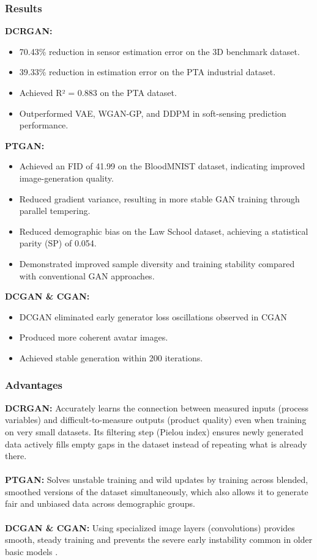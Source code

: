 \documentclass[12pt,a4paper]{article}
\begin{document}
\subsubsection{Results}
\textbf{DCRGAN:}
\begin{itemize}
    \item 70.43\% reduction in sensor estimation error on the 3D benchmark dataset.
    \item 39.33\% reduction in estimation error on the PTA industrial dataset.
    \item Achieved R² = 0.883 on the PTA dataset.
    \item Outperformed VAE, WGAN-GP, and DDPM in soft-sensing prediction performance.
\end{itemize}
\textbf{PTGAN:}
\begin{itemize}
    \item Achieved an FID of 41.99 on the BloodMNIST dataset, indicating improved image-generation quality.
    \item Reduced gradient variance, resulting in more stable GAN training through parallel tempering.
    \item Reduced demographic bias on the Law School dataset, achieving a statistical parity (SP) of 0.054.
    \item Demonstrated improved sample diversity and training stability compared with conventional GAN approaches.
\end{itemize}
\textbf{DCGAN \& CGAN:}
\begin{itemize}
    \item DCGAN eliminated early generator loss oscillations observed in CGAN
    \item Produced more coherent avatar images.
    \item Achieved stable generation within 200 iterations.
\end{itemize}

\subsubsection{Advantages}
\textbf{DCRGAN:} Accurately learns the connection between measured inputs (process variables) and difficult-to-measure outputs (product quality) even when training on very small datasets. Its filtering step (Pielou index) ensures newly generated data actively fills empty gaps in the dataset instead of repeating what is already there. \\
\\ \textbf{PTGAN:} Solves unstable training and wild updates by training across blended, smoothed versions of the dataset simultaneously, which also allows it to generate fair and unbiased data across demographic groups. \\
\\ \textbf{DCGAN \& CGAN:} Using specialized image layers (convolutions) provides smooth, steady training and prevents the severe early instability common in older basic models .
\end{document}
